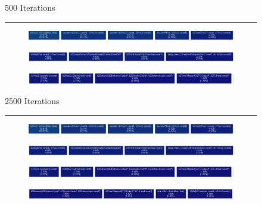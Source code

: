 \documentclass{report}
\begin{document}
\begin{figure}
\Large \begin{center}500 Iterations \hrule \end{center}
\begin{subfigure}[h]{\textwidth}
\includegraphics[width=\textwidth, height=0.1\textwidth]{gprof/500_1.png}
\caption{}
\end{subfigure}
\begin{subfigure}[h]{\textwidth}
\includegraphics[width=\textwidth, height=0.1\textwidth]{gprof/500_2.png}
\caption{}
\end{subfigure}
\begin{subfigure}[h]{\textwidth}
\includegraphics[width=\textwidth, height=0.1\textwidth]{gprof/500_3.png}
\caption{}
\end{subfigure}
\end{figure}
\begin{figure}
\Large \begin{center}2500 Iterations \hrule \end{center}
\begin{subfigure}[h]{\textwidth}
\includegraphics[width=\textwidth, height=0.1\textwidth]{gprof/500_1.png}
\caption{}
\end{subfigure}
\begin{subfigure}[h]{\textwidth}
\includegraphics[width=\textwidth, height=0.1\textwidth]{gprof/500_2.png}
\caption{}
\end{subfigure}
\begin{subfigure}[h]{\textwidth}
\includegraphics[width=\textwidth, height=0.1\textwidth]{gprof/500_3.png}
\caption{}
\end{subfigure}
\begin{subfigure}[h]{\textwidth}
\includegraphics[width=\textwidth, height=0.1\textwidth]{gprof/500_4.png}
\caption{}
\end{subfigure}
\end{figure}
\end{document}
